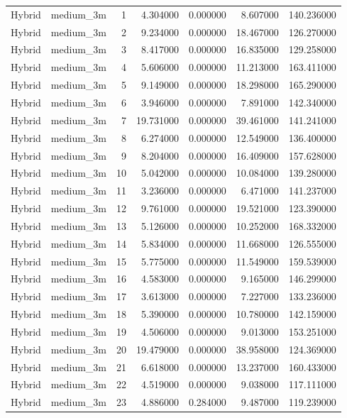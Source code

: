 \begin{tabular}{llrrrrr}
Hybrid & medium_3m & 1 & 4.304000 & 0.000000 & 8.607000 & 140.236000 \\
Hybrid & medium_3m & 2 & 9.234000 & 0.000000 & 18.467000 & 126.270000 \\
Hybrid & medium_3m & 3 & 8.417000 & 0.000000 & 16.835000 & 129.258000 \\
Hybrid & medium_3m & 4 & 5.606000 & 0.000000 & 11.213000 & 163.411000 \\
Hybrid & medium_3m & 5 & 9.149000 & 0.000000 & 18.298000 & 165.290000 \\
Hybrid & medium_3m & 6 & 3.946000 & 0.000000 & 7.891000 & 142.340000 \\
Hybrid & medium_3m & 7 & 19.731000 & 0.000000 & 39.461000 & 141.241000 \\
Hybrid & medium_3m & 8 & 6.274000 & 0.000000 & 12.549000 & 136.400000 \\
Hybrid & medium_3m & 9 & 8.204000 & 0.000000 & 16.409000 & 157.628000 \\
Hybrid & medium_3m & 10 & 5.042000 & 0.000000 & 10.084000 & 139.280000 \\
Hybrid & medium_3m & 11 & 3.236000 & 0.000000 & 6.471000 & 141.237000 \\
Hybrid & medium_3m & 12 & 9.761000 & 0.000000 & 19.521000 & 123.390000 \\
Hybrid & medium_3m & 13 & 5.126000 & 0.000000 & 10.252000 & 168.332000 \\
Hybrid & medium_3m & 14 & 5.834000 & 0.000000 & 11.668000 & 126.555000 \\
Hybrid & medium_3m & 15 & 5.775000 & 0.000000 & 11.549000 & 159.539000 \\
Hybrid & medium_3m & 16 & 4.583000 & 0.000000 & 9.165000 & 146.299000 \\
Hybrid & medium_3m & 17 & 3.613000 & 0.000000 & 7.227000 & 133.236000 \\
Hybrid & medium_3m & 18 & 5.390000 & 0.000000 & 10.780000 & 142.159000 \\
Hybrid & medium_3m & 19 & 4.506000 & 0.000000 & 9.013000 & 153.251000 \\
Hybrid & medium_3m & 20 & 19.479000 & 0.000000 & 38.958000 & 124.369000 \\
Hybrid & medium_3m & 21 & 6.618000 & 0.000000 & 13.237000 & 160.433000 \\
Hybrid & medium_3m & 22 & 4.519000 & 0.000000 & 9.038000 & 117.111000 \\
Hybrid & medium_3m & 23 & 4.886000 & 0.284000 & 9.487000 & 119.239000 \\

\end{tabular}
